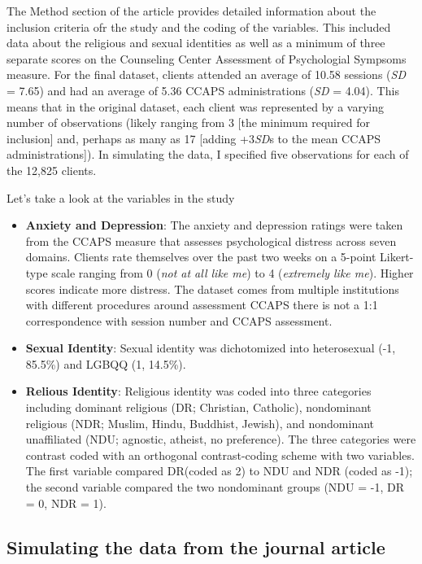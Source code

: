 \documentclass[
  english,
]{book}
\begin{document}
The Method section of the article provides detailed information about the inclusion criteria ofr the study and the coding of the variables. This included data about the religious and sexual identities as well as a minimum of three separate scores on the Counseling Center Assessment of Psychologial Sympsoms \citep[CCAPS,][]{locke_development_2012} measure. For the final dataset, clients attended an average of 10.58 sessions (\emph{SD} = 7.65) and had an average of 5.36 CCAPS administrations (\emph{SD} = 4.04). This means that in the original dataset, each client was represented by a varying number of observations (likely ranging from 3 {[}the minimum required for inclusion{]} and, perhaps as many as 17 {[}adding +3\emph{SD}s to the mean CCAPS administrations{]}). In simulating the data, I specified five observations for each of the 12,825 clients.

Let's take a look at the variables in the study

\begin{itemize}
\item
  \textbf{Anxiety and Depression}: The anxiety and depression ratings were taken from the CCAPS measure \citep{locke_development_2012} that assesses psychological distress across seven domains. Clients rate themselves over the past two weeks on a 5-point Likert-type scale ranging from 0 (\emph{not at all like me}) to 4 (\emph{extremely like me}). Higher scores indicate more distress. The dataset comes from multiple institutions with different procedures around assessment CCAPS there is not a 1:1 correspondence with session number and CCAPS assessment.
\item
  \textbf{Sexual Identity}: Sexual identity was dichotomized into heterosexual (-1, 85.5\%) and LGBQQ (1, 14.5\%).
\item
  \textbf{Relious Identity}: Religious identity was coded into three categories including dominant religious (DR; Christian, Catholic), nondominant religious (NDR; Muslim, Hindu, Buddhist, Jewish), and nondominant unaffiliated (NDU; agnostic, atheist, no preference). The three categories were contrast coded with an orthogonal contrast-coding scheme with two variables. The first variable compared DR(coded as 2) to NDU and NDR (coded as -1); the second variable compared the two nondominant groups (NDU = -1, DR = 0, NDR = 1).
\end{itemize}

\hypertarget{simulating-the-data-from-the-journal-article-1}{%
\subsection{Simulating the data from the journal article}\label{simulating-the-data-from-the-journal-article-1}}
\end{document}

